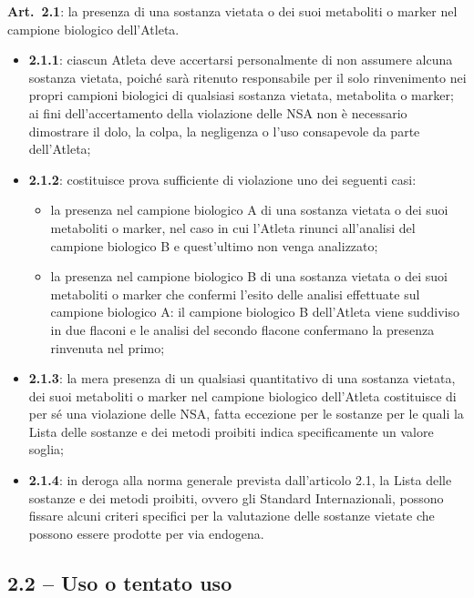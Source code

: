 \textbf{Art.\ 2.1}: la presenza di una sostanza vietata o dei suoi metaboliti o marker nel
campione biologico dell'Atleta.
\begin{itemize}
  \item \textbf{2.1.1}: ciascun Atleta deve accertarsi personalmente di non assumere alcuna
    sostanza vietata, poiché sarà ritenuto responsabile per il solo rinvenimento nei propri
    campioni biologici di qualsiasi sostanza vietata, metabolita o marker; ai fini
    dell'accertamento della violazione delle NSA non è necessario dimostrare il dolo, la colpa,
    la negligenza o l'uso consapevole da parte dell'Atleta;
  \item \textbf{2.1.2}: costituisce prova sufficiente di violazione uno dei seguenti casi:
    \begin{itemize}
      \item la presenza nel campione biologico A di una sostanza vietata o dei suoi metaboliti o
        marker, nel caso in cui l'Atleta rinunci all'analisi del campione biologico B e
        quest'ultimo non venga analizzato;
      \item la presenza nel campione biologico B di una sostanza vietata o dei suoi metaboliti o
        marker che confermi l'esito delle analisi effettuate sul campione biologico A: il
        campione biologico B dell'Atleta viene suddiviso in due flaconi e le analisi del secondo
        flacone confermano la presenza rinvenuta nel primo;
    \end{itemize}
  \item \textbf{2.1.3}: la mera presenza di un qualsiasi quantitativo di una sostanza vietata,
    dei suoi metaboliti o marker nel campione biologico dell'Atleta costituisce di per sé una
    violazione delle NSA, fatta eccezione per le sostanze per le quali la Lista delle sostanze e
    dei metodi proibiti indica specificamente un valore soglia;
  \item \textbf{2.1.4}: in deroga alla norma generale prevista dall'articolo 2.1, la Lista delle
    sostanze e dei metodi proibiti, ovvero gli Standard Internazionali, possono fissare alcuni
    criteri specifici per la valutazione delle sostanze vietate che possono essere prodotte per
    via endogena.
\end{itemize}

\subsection{2.2 -- Uso o tentato uso}

